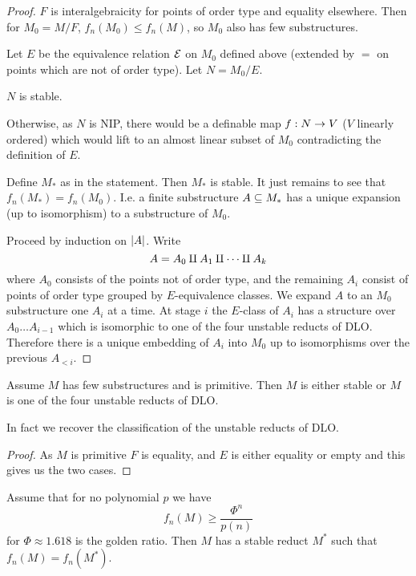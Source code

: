 \documentclass{amsart}
\begin{document}
\begin{proof}
$F$ is interalgebraicity for points of order type and equality elsewhere. 
Then for $M_0 = M / F$, $f_n\left(M_0\right) \leq f_n\left(M\right)$, so $M_0$ also has
few substructures.

Let $E$ be the equivalence relation $\mathcal{E}$ on $M_0$ defined above (extended by $=$ on
points which are not of order type).
Let $N = M_0 / E$. 
\begin{clm}
$N$ is stable.
\end{clm}
Otherwise, as $N$ is NIP, there would be a definable map $f:N\rightarrow V$ ($V$ linearly
ordered) which would lift to an almost linear subset of $M_0$ 
contradicting the definition of $E$.

Define $M_*$ as in the statement. Then $M_*$ is stable. It just remains to see that
$f_n\left(M_*\right) = f_n\left(M_0\right)$. I.e. a finite substructure $A\subseteq M_*$ has
a unique expansion
(up to isomorphism) to a substructure of $M_0$.

Proceed by induction on $\left| A \right|$. 
Write
\begin{equation}
A = A_0 \amalg A_1 \amalg \cdots \amalg A_k
\end{equation}
where $A_0$ consists of the points not of order type, and the remaining $A_i$ consist of
points of order type grouped by $E$-equivalence classes.
We expand $A$ to an $M_0$ substructure one $A_i$ at a time.
At stage $i$ the $E$-class of $A_i$ has a structure over $A_0\ldots A_{i-1}$ which is
isomorphic to one of the four unstable reducts of DLO. Therefore there is a unique
embedding of
$A_i$ into $M_0$ up to isomorphisms over the previous $A_{<i}$.
\end{proof}

\begin{thm}
Assume $M$ has few substructures and is primitive. Then 
$M$ is either stable or $M$ is one of the four unstable reducts of DLO.
\end{thm}

In fact we recover the classification of the unstable reducts of DLO.

\begin{proof}
As $M$ is primitive $F$ is equality, and $E$ is either equality or empty and this
gives us the two cases.
\end{proof}

\begin{cor}
Assume that for no polynomial $p$ we have
\begin{equation}
f_n\left(M\right)\geq \frac{\Phi^n}{p\left(n\right)}
\end{equation}
for $\Phi\approx 1.618$ is the golden ratio. Then $M$ has a stable reduct $M^*$ such that
$f_n\left(M\right) = f_n\left(M^*\right)$.
\end{cor}
\end{document}
